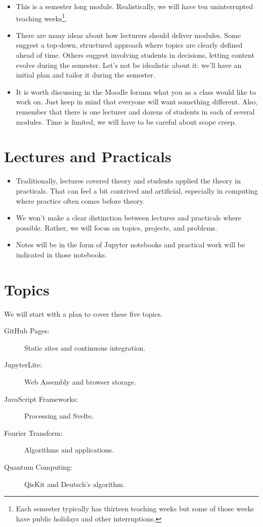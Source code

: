 \documentclass[a4paper]{tufte-handout}
\begin{document}
\begin{itemize}
  \item This is a semester long module. Realistically, we will have ten uninterrupted teaching weeks\footnote{Each semester typically has thirteen teaching weeks but some of those weeks have public holidays and other interruptions.}.
  \item There are many ideas about how lecturers should deliver modules. Some suggest a top-down, structured approach where topics are clearly defined ahead of time. Others suggest involving students in decisions, letting content evolve during the semester. Let's not be idealistic about it: we'll have an initial plan and tailor it during the semester.
  \item It is worth discussing in the Moodle forums what you as a class would like to work on. Just keep in mind that everyone will want something different. Also, remember that there is one lecturer and dozens of students in each of several modules. Time is limited, we will have to be careful about scope creep.
\end{itemize}

 
\section{Lectures and Practicals}

\begin{itemize}
  \item Traditionally, lectures covered theory and students applied the theory in practicals. That can feel a bit contrived and artificial, especially in computing where practice often comes before theory.
  \item We won't make a clear distinction between lectures and practicals where possible. Rather, we will focus on topics, projects, and problems.
  \item Notes will be in the form of Jupyter notebooks and practical work will be indicated in those notebooks.
\end{itemize}


\section{Topics}

We will start with a plan to cover these five topics.

\begin{description}
  \item[GitHub Pages:] Static sites and continuous integration.
  \item[JupyterLite:] Web Assembly and browser storage.
  \item[JavaScript Frameworks:] Processing and Svelte. 
  \item[Fourier Transform:] Algorithms and applications.
  \item[Quantum Computing:] QisKit and Deutsch's algorithm.
\end{description}
\end{document}
